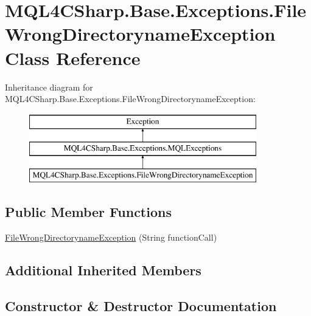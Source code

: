 \hypertarget{class_m_q_l4_c_sharp_1_1_base_1_1_exceptions_1_1_file_wrong_directoryname_exception}{}\section{M\+Q\+L4\+C\+Sharp.\+Base.\+Exceptions.\+File\+Wrong\+Directoryname\+Exception Class Reference}
\label{class_m_q_l4_c_sharp_1_1_base_1_1_exceptions_1_1_file_wrong_directoryname_exception}
Inheritance diagram for M\+Q\+L4\+C\+Sharp.\+Base.\+Exceptions.\+File\+Wrong\+Directoryname\+Exception\+:\begin{figure}[H]
\begin{center}
\leavevmode
\includegraphics[height=3.000000cm]{class_m_q_l4_c_sharp_1_1_base_1_1_exceptions_1_1_file_wrong_directoryname_exception}
\end{center}
\end{figure}
\subsection*{Public Member Functions}
\begin{DoxyCompactItemize}
\item 
\hyperlink{class_m_q_l4_c_sharp_1_1_base_1_1_exceptions_1_1_file_wrong_directoryname_exception_aa371180b1a0a464c513e2a31046103ef}{File\+Wrong\+Directoryname\+Exception} (String function\+Call)
\end{DoxyCompactItemize}
\subsection*{Additional Inherited Members}


\subsection{Constructor \& Destructor Documentation}
